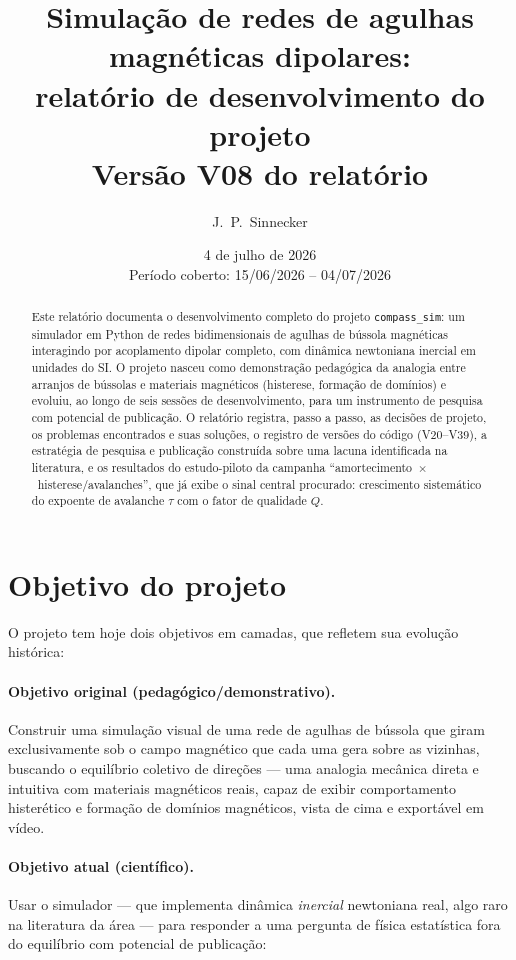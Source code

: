 \documentclass[11pt,a4paper]{article}
\title{\textbf{Simulação de redes de agulhas magnéticas dipolares:\\
relatório de desenvolvimento do projeto \code{compass\_sim}}\\[1ex]
\large Versão V08 do relatório}
\author{J.~P.~Sinnecker}
\date{4 de julho de 2026\\[0.5ex]
\small Período coberto: 15/06/2026 -- 04/07/2026}
\newcommand{\code}[1]{\texttt{#1}}
\begin{document}
\maketitle

\begin{abstract}
\noindent
Este relatório documenta o desenvolvimento completo do projeto
\code{compass\_sim}: um simulador em Python de redes bidimensionais de
agulhas de bússola magnéticas interagindo por acoplamento dipolar
completo, com dinâmica newtoniana inercial em unidades do SI. O projeto
nasceu como demonstração pedagógica da analogia entre arranjos de
bússolas e materiais magnéticos (histerese, formação de domínios) e
evoluiu, ao longo de seis sessões de desenvolvimento, para um
instrumento de pesquisa com potencial de publicação. O relatório
registra, passo a passo, as decisões de projeto, os problemas
encontrados e suas soluções, o registro de versões do código
(V20--V39), a estratégia de pesquisa e publicação construída sobre uma
lacuna identificada na literatura, e os resultados do estudo-piloto da
campanha ``amortecimento~$\times$~histerese/avalanches'', que já exibe o
sinal central procurado: crescimento sistemático do expoente de
avalanche $\tau$ com o fator de qualidade $Q$.
\end{abstract}

\tableofcontents
\newpage

\section{Objetivo do projeto}

O projeto tem hoje dois objetivos em camadas, que refletem sua evolução
histórica:

\paragraph{Objetivo original (pedagógico/demonstrativo).}
Construir uma simulação visual de uma rede de agulhas de bússola que
giram exclusivamente sob o campo magnético que cada uma gera sobre as
vizinhas, buscando o equilíbrio coletivo de direções --- uma analogia
mecânica direta e intuitiva com materiais magnéticos reais, capaz de
exibir comportamento histerético e formação de domínios magnéticos,
vista de cima e exportável em vídeo.

\paragraph{Objetivo atual (científico).}
Usar o simulador --- que implementa dinâmica \emph{inercial} newtoniana
real, algo raro na literatura da área --- para responder a uma pergunta
de física estatística fora do equilíbrio com potencial de publicação:
\end{document}
